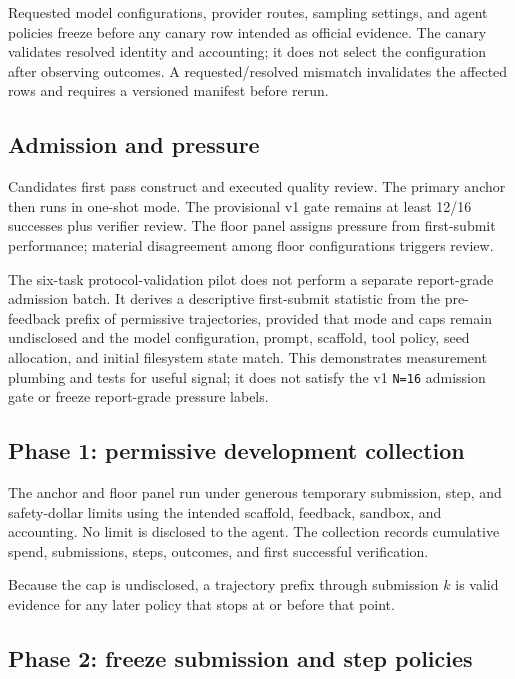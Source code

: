 \documentclass[11pt]{article}
\begin{document}
Requested model configurations, provider routes, sampling settings, and agent policies freeze before any canary row intended as official evidence. The canary validates resolved identity and accounting; it does not select the configuration after observing outcomes. A requested/resolved mismatch invalidates the affected rows and requires a versioned manifest before rerun.

\subsection{Admission and pressure}\hypertarget{62-admission-and-pressure}{}\label{62-admission-and-pressure}

Candidates first pass construct and executed quality review. The primary anchor then runs in one-shot mode. The provisional v1 gate remains at least 12/16 successes plus verifier review. The floor panel assigns pressure from first-submit performance; material disagreement among floor configurations triggers review.

The six-task protocol-validation pilot does not perform a separate report-grade admission batch. It derives a descriptive first-submit statistic from the pre-feedback prefix of permissive trajectories, provided that mode and caps remain undisclosed and the model configuration, prompt, scaffold, tool policy, seed allocation, and initial filesystem state match. This demonstrates measurement plumbing and tests for useful signal; it does not satisfy the v1 \texttt{N=16} admission gate or freeze report-grade pressure labels.

\subsection{Phase 1: permissive development collection}\hypertarget{63-phase-1-permissive-development-collection}{}\label{63-phase-1-permissive-development-collection}

The anchor and floor panel run under generous temporary submission, step, and safety-dollar limits using the intended scaffold, feedback, sandbox, and accounting. No limit is disclosed to the agent. The collection records cumulative spend, submissions, steps, outcomes, and first successful verification.

Because the cap is undisclosed, a trajectory prefix through submission $k$ is valid evidence for any later policy that stops at or before that point.

\subsection{Phase 2: freeze submission and step policies}\hypertarget{64-phase-2-freeze-submission-and-step-policies}{}\label{64-phase-2-freeze-submission-and-step-policies}
\end{document}
